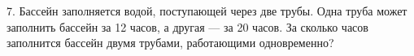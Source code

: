 7. Бассейн заполняется водой, поступающей через две трубы. Одна труба может заполнить бассейн за 12 часов, а другая --- за 20 часов. За сколько часов заполнится бассейн двумя трубами, работающими одновременно?\\
